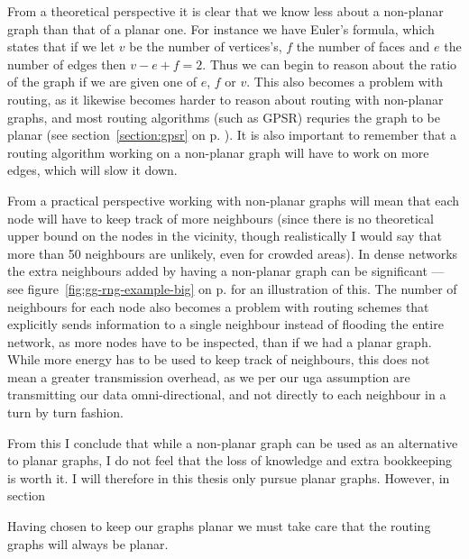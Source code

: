 From a theoretical perspective it is clear that we know less about a non-planar graph than that of a planar one. For instance we have Euler's formula, which states that if we let $v$ be the number of vertices's, $f$ the number of faces and $e$ the number of edges then $v - e + f = 2$. Thus we can begin to reason about the ratio of the graph if we are given one of $e$, $f$ or $v$. This also becomes a problem with routing, as it likewise becomes harder to reason about routing with non-planar graphs, and most routing algorithms (such as GPSR) requries the graph to be planar (see section~\ref{section:gpsr} on p. \pageref{section:gpsr}). It is also important to remember that a routing algorithm working on a non-planar graph will have to work on more edges, which will slow it down.

From a practical perspective working with non-planar graphs will mean that each node will have to keep track of more neighbours (since there is no theoretical upper bound on the nodes in the vicinity, though realistically I would say that more than 50 neighbours are unlikely, even for crowded areas). In dense networks the extra neighbours added by having a non-planar graph can be significant --- see figure~\ref{fig:gg-rng-example-big} on p. \pageref{fig:gg-rng-example-big} for an illustration of this. The number of neighbours for each node also becomes a problem with routing schemes that explicitly sends information to a single neighbour instead of flooding the entire network, as more nodes have to be inspected, than if we had a planar graph. While more energy has to be used to keep track of neighbours, this does not mean a greater transmission overhead, as we per our \ac{uga} assumption are transmitting our data omni-directional, and not directly to each neighbour in a turn by turn fashion.

From this I conclude that while a non-planar graph can be used as an alternative to planar graphs, I do not feel that the loss of knowledge and extra bookkeeping is worth it. I will therefore in this thesis only pursue planar graphs. However, in section
 
Having chosen to keep our graphs planar we must take care that the routing graphs will always be planar.

